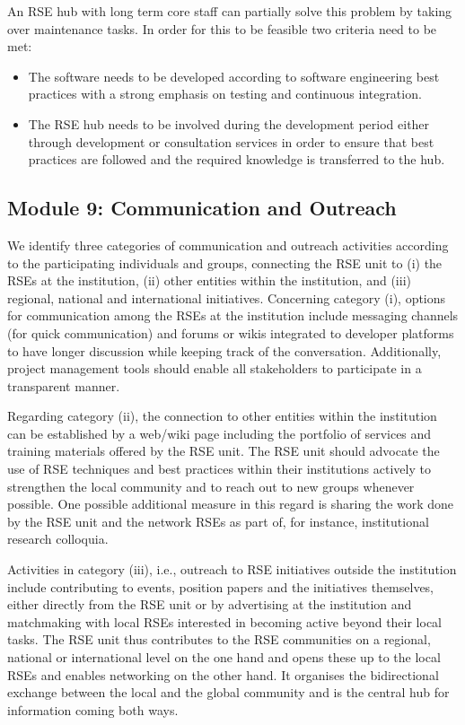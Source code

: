 \documentclass[a4paper]{article}
\begin{document}
An RSE hub with long term core staff can partially solve this problem by taking over maintenance tasks.
In order for this to be feasible two criteria need to be met:
\begin{itemize}
\item The software needs to be developed according to software engineering best practices with a strong emphasis on testing and continuous integration.
\item The RSE hub needs to be involved during the development period either through development or consultation services in order to ensure that best practices are followed and the required knowledge is transferred to the hub.
\end{itemize}

\subsection{Module 9: Communication and Outreach}%
\label{sec:outreach}

We identify three categories of communication and outreach activities according to the participating individuals and groups, connecting the RSE unit to (i) the RSEs at the institution, (ii) other entities within the institution, and (iii) regional, national and international initiatives.
Concerning category (i), options for communication among the RSEs at the institution include messaging channels (for quick communication) and forums or wikis integrated to developer platforms to have longer discussion while keeping track of the conversation.
Additionally, project management tools should enable all stakeholders to participate in a transparent manner.

Regarding category (ii), the connection to other entities within the institution can be established by a web/wiki page including the portfolio of services and training materials offered by the RSE unit.
The RSE unit should advocate the use of RSE techniques and best practices within their institutions actively to strengthen the local community and to reach out to new groups whenever possible.
One possible additional measure in this regard is sharing the work done by the RSE unit and the network RSEs as part of, for instance, institutional research colloquia.

Activities in category (iii), i.e., outreach to RSE initiatives outside the institution include contributing to events, position papers and the initiatives themselves, either directly from the RSE unit or by advertising at the institution and matchmaking with local RSEs interested in becoming active beyond their local tasks.
The RSE unit thus contributes to the RSE communities on a regional, national or international level on the one hand and opens these up to the local RSEs and enables networking on the other hand.
It organises the bidirectional exchange between the local and the global community and is the central hub for information coming both ways.
\end{document}
